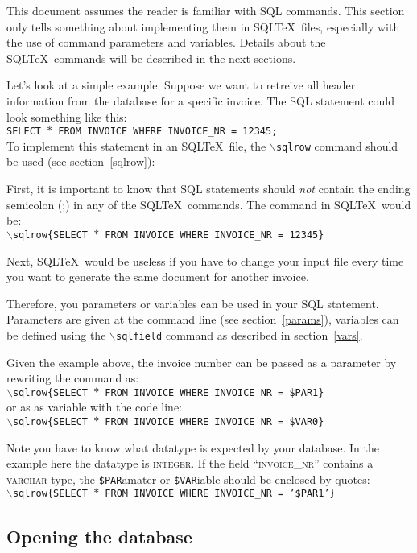 \documentclass{article}
\newcommand{\bs}{\begin{math}\backslash\end{math}}
\newcommand{\vs}{\vspace{3mm}}
\begin{document}
This document assumes the reader is familiar with SQL commands. This section only tells something about
implementing them in SQL\TeX\ files, especially with the use of command parameters and variables.
Details about the SQL\TeX\ commands will be described in the next sections.

\vs

Let's look at a simple example. Suppose we want to retreive all header information from the database
for a specific invoice. The SQL statement could look something like this: \\
\texttt{SELECT $\ast$ FROM INVOICE WHERE INVOICE\_NR = 12345;}\\
To implement this statement in an SQL\TeX\ file, the \texttt{\bs sqlrow} command should be used (see
section~\ref{sqlrow}):

First, it is important to know that SQL statements should \textit{not} contain the ending semicolon (;) in
any of the SQL\TeX\ commands. The command in SQL\TeX\ would be:\\
\texttt{\bs sqlrow\{SELECT $\ast$ FROM INVOICE WHERE INVOICE\_NR = 12345\}}

Next, SQL\TeX\ would be useless if you have to change your input file every time you want to generate
the same document for another invoice.

\vs

Therefore, you parameters or variables can be used in your SQL statement. Parameters are given at the command
line (see section~\ref{params}), variables can be defined using the \texttt{\bs sqlfield} command as
described in section~\ref{vars}.

Given the example above, the invoice number can be passed as a parameter by rewriting the command as: \\
\texttt{\bs sqlrow\{SELECT $\ast$ FROM INVOICE WHERE INVOICE\_NR = \$PAR1\}} \\
or as as variable with the code line: \\
\texttt{\bs sqlrow\{SELECT $\ast$ FROM INVOICE WHERE INVOICE\_NR = \$VAR0\}}

Note you have to know what datatype is expected by your database. In the example here the datatype is
\textsc{integer}. If the field ``\textsc{invoice\_nr}'' contains a \textsc{varchar} type, the
\texttt{\$PAR}amater or \texttt{\$VAR}iable should be enclosed by quotes: \\
\texttt{\bs sqlrow\{SELECT $\ast$ FROM INVOICE WHERE INVOICE\_NR = '\$PAR1'\}}

\subsection{Opening the database}
\end{document}
